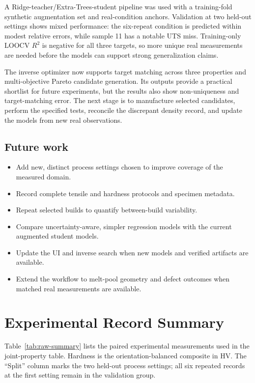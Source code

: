 \documentclass[12pt,a4paper,oneside]{report}
\begin{document}
A Ridge-teacher/Extra-Trees-student pipeline was used with a training-fold synthetic augmentation set and real-condition anchors. Validation at two held-out settings shows mixed performance: the six-repeat condition is predicted within modest relative errors, while sample 11 has a notable UTS miss. Training-only LOOCV $R^2$ is negative for all three targets, so more unique real measurements are needed before the models can support strong generalization claims.

The inverse optimizer now supports target matching across three properties and multi-objective Pareto candidate generation. Its outputs provide a practical shortlist for future experiments, but the results also show non-uniqueness and target-matching error. The next stage is to manufacture selected candidates, perform the specified tests, reconcile the discrepant density record, and update the models from new real observations.

\section*{Future work}
\begin{itemize}
  \item Add new, distinct process settings chosen to improve coverage of the measured domain.
  \item Record complete tensile and hardness protocols and specimen metadata.
  \item Repeat selected builds to quantify between-build variability.
  \item Compare uncertainty-aware, simpler regression models with the current augmented student models.
  \item Update the UI and inverse search when new models and verified artifacts are available.
  \item Extend the workflow to melt-pool geometry and defect outcomes when matched real measurements are available.
\end{itemize}

\appendix
\chapter{Experimental Record Summary}
Table~\ref{tab:raw-summary} lists the paired experimental measurements used in the joint-property table. Hardness is the orientation-balanced composite in HV. The ``Split'' column marks the two held-out process settings; all six repeated records at the first setting remain in the validation group.
\end{document}
